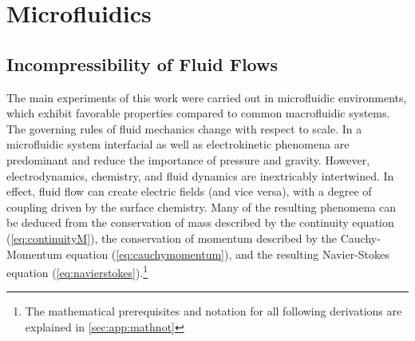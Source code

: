 \section{Microfluidics}

\subsection{Incompressibility of Fluid Flows}

\label{sec:theo:incomp}

The main experiments of this work were carried out in microfluidic environments, which exhibit favorable properties compared to common macrofluidic systems. The governing rules of fluid mechanics change with respect to scale. In a microfluidic system interfacial as well as electrokinetic phenomena are predominant and reduce the importance of pressure and gravity.\cite{lit:fluidic:kirby} However, electrodynamics, chemistry, and fluid dynamics are inextricably intertwined. In effect, fluid flow can create electric fields (and vice versa), with a degree of coupling driven by the surface chemistry. Many of the resulting phenomena can be deduced from the conservation of mass described by the continuity equation (\cref{eq:continuityM}), the conservation of momentum described by the Cauchy-Momentum equation (\cref{eq:cauchymomentum}), and the resulting Navier-Stokes equation (\cref{eq:navierstokes}).\footnote{The mathematical prerequisites and notation for all following derivations are explained in \cref{sec:app:mathnot}}

